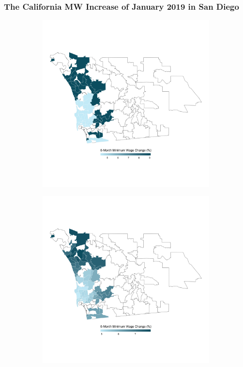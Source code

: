 \begin{frame}[label=san_diego_mw]
	\frametitle{The California MW Increase of January 2019 in San Diego} 
	
	
	\begin{figure}
		\begin{subfigure}[b]{0.49\textwidth}
			\includegraphics[width = .85\textwidth]
				{../../analysis/descriptive_maps/output/San_Diego_mw_msa.png}
		\end{subfigure}%
		\begin{subfigure}[b]{0.49\textwidth}
			\includegraphics[width = .85\textwidth]
				{../../analysis/descriptive_maps/output/San_Diego_expmw_msa.png}
		\end{subfigure}
	\end{figure}
	
	\hyperlink{san_diego_rents}{}
\end{frame}

